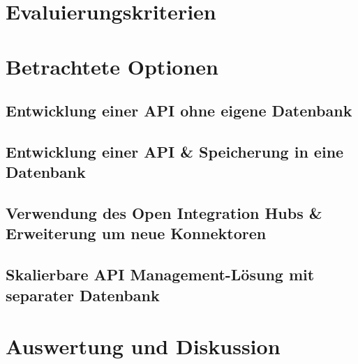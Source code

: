 
\section{Evaluierungskriterien}


\section{Betrachtete Optionen}

\subsection{Entwicklung einer API ohne eigene Datenbank}


\subsection{Entwicklung einer API \& Speicherung in eine Datenbank}


\subsection{Verwendung des Open Integration Hubs \& Erweiterung um neue Konnektoren} \label{subsection:oih}


\subsection{Skalierbare API Management-Lösung mit separater Datenbank}


\section{Auswertung und Diskussion} \label{section:auswertung}
